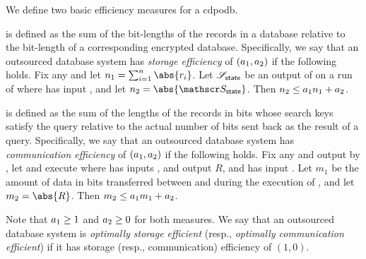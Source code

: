 		We define two basic efficiency measures for a \acrshort{cdpodb}.
		\begin{description}[style=unboxed, leftmargin=0em]
			\item[Storage efficiency]
				is defined as the sum of the bit-lengths of the records in a database relative to the bit-length of a corresponding encrypted database.
				Specifically, we say that an outsourced database system has \emph{storage efficiency} of $(a_1, a_2)$ if the following holds.
				Fix any \databaseDef{} and let $n_1 = \sum_{i=1}^n \abs{r_i}$.
				Let $\mathscr{S}_\mathsf{state}$ be an output of \server{} on a run of \protocolSetup{} where \user{} has input \database{}, and let $n_2 = \abs{ \server_\mathsf{state} }$.
				Then $n_2 \leq a_1 n_1 + a_2$.

			\item[Communication efficiency]
				is defined as the sum of the lengths of the records in bits whose search keys satisfy the query relative to the actual number of bits sent back as the result of a query.
				Specifically, we say that an outsourced database system has \emph{communication efficiency} of $(a_1, a_2)$ if the following holds.
				Fix any \query{} and \serverDS{} output by \protocolSetup{}, let \user{} and \server{} execute \protocolQuery{} where \user{} has inputs \query{}, and output $R$, and \server{} has input \serverDS{}.
				Let $m_1$ be the amount of data in bits transferred between \user{} and \server{} during the execution of \protocolQuery{}, and let $m_2 = \abs{ R }$.
				Then $m_2 \leq a_1 m_1 + a_2$.
		\end{description}

		Note that $a_1 \geq 1$ and $a_2 \geq 0$ for both measures.
		We say that an outsourced database system is \emph{optimally storage efficient} (resp., \emph{optimally communication efficient}) if it has storage (resp., communication) efficiency of $(1, 0)$.
